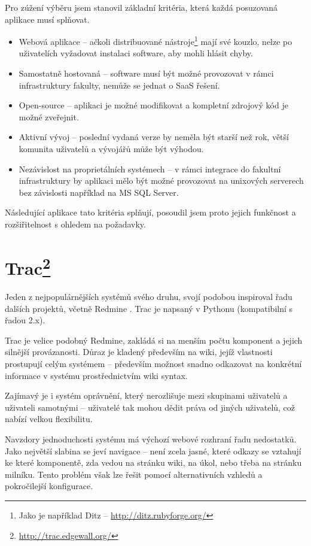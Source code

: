 \documentclass[thesis=B,czech]{FITthesis}[2012/05/02]
\begin{document}
Pro zúžení výběru jsem stanovil základní kritéria, která každá
posuzovaná aplikace musí splňovat.

\begin{itemize}
\item
  Webová aplikace -- ačkoli distribuované nástroje\footnote{Jako je
    například Ditz -- \url{http://ditz.rubyforge.org/}} mají své kouzlo,
  nelze po uživatelích vyžadovat instalaci software, aby mohli hlásit
  chyby.
\item
  Samostatně hostovaná -- software musí být možné provozovat v rámci
  infrastruktury fakulty, nemůže se jednat o \gls{SaaS} řešení.
\item
  Open-source -- aplikaci je možné modifikovat a kompletní zdrojový kód
  je možné zveřejnit.
\item
  Aktivní vývoj -- poslední vydaná verze by neměla být starší než rok,
  větší komunita uživatelů a vývojářů může být výhodou.
\item
  Nezávislost na proprietálních systémech -- v rámci integrace do
  fakultní infrastruktury by aplikaci mělo být možné provozovat na
  unixových serverech bez závislosti například na MS SQL Server.
\end{itemize}
Následující aplikace tato kritéria splňují, posoudil jsem proto jejich
funkčnost a rozšiřitelnost s ohledem na požadavky.

\section[Trac]{Trac\footnote{\url{http://trac.edgewall.org/}}}

Jeden z nejpopulárnějších systémů svého druhu, svojí podobou inspiroval
řadu dalších projektů, včetně Redmine \citep{TracRedMine}. Trac je
napsaný v Pythonu (kompatibilní s řadou 2.x).

Trac je velice podobný Redmine, zakládá si na menším počtu komponent a
jejich silnější provázanosti. Důraz je kladený především na wiki, jejíž
vlastnosti prostupují celým systémem -- především možnost snadno
odkazovat na konkrétní informace v systému prostřednictvím wiki syntax.

Zajímavý je i systém oprávnění, který nerozlišuje mezi skupinami
uživatelů a uživateli samotnými -- uživatelé tak mohou dědit práva od
jiných uživatelů, což nabízí velkou flexibilitu.

Navzdory jednoduchosti systému má výchozí webové rozhraní řadu
nedostatků. Jako největší slabina se jeví navigace -- není zcela jasné,
které odkazy se vztahují ke které komponentě, zda vedou na stránku wiki,
na úkol, nebo třeba na stránku milníku. Tento problém však lze řešit
pomocí alternativních vzhledů a pokročilejší konfigurace.
\end{document}
